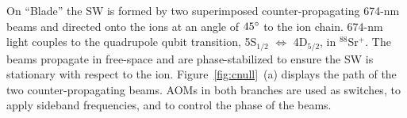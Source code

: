 \documentclass[12pt]{iopart}
\begin{document}
    On ``Blade'' the SW is formed by two superimposed
    counter-propagating 674-nm beams and directed onto the ions at an
    angle of $45\degree$ to the ion chain. 674-nm light couples to
    the quadrupole qubit transition, 5S$_{1/2}$ $\Leftrightarrow$
    4D$_{5/2}$, in $^{88}$Sr$^+$.  The beams propagate in free-space
    and are phase-stabilized to ensure the SW is stationary with
    respect to the ion. Figure~\ref{fig:cnull}~(a) displays the path
    of the two counter-propagating beams. AOMs in both branches are
    used as switches, to apply sideband frequencies, and to control
    the phase of the beams.\\




\end{document}
